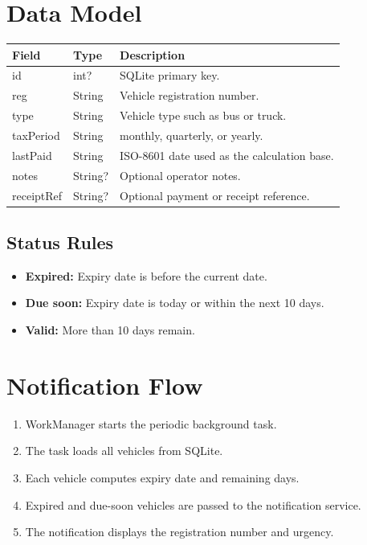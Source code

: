 \documentclass[11pt,a4paper]{article}
\begin{document}
\section{Data Model}

\begin{longtable}{p{} p{} p{}}
\toprule
\textbf{Field} & \textbf{Type} & \textbf{Description} \\
\midrule
id & int? & SQLite primary key. \\
reg & String & Vehicle registration number. \\
type & String & Vehicle type such as bus or truck. \\
taxPeriod & String & monthly, quarterly, or yearly. \\
lastPaid & String & ISO-8601 date used as the calculation base. \\
notes & String? & Optional operator notes. \\
receiptRef & String? & Optional payment or receipt reference. \\
\bottomrule
\end{longtable}

\subsection{Status Rules}
\begin{itemize}[leftmargin=*]
  \item \textbf{Expired:} Expiry date is before the current date.
  \item \textbf{Due soon:} Expiry date is today or within the next 10 days.
  \item \textbf{Valid:} More than 10 days remain.
\end{itemize}

\section{Notification Flow}

\begin{enumerate}[leftmargin=*]
  \item WorkManager starts the periodic background task.
  \item The task loads all vehicles from SQLite.
  \item Each vehicle computes expiry date and remaining days.
  \item Expired and due-soon vehicles are passed to the notification service.
  \item The notification displays the registration number and urgency.
\end{enumerate}
\end{document}
